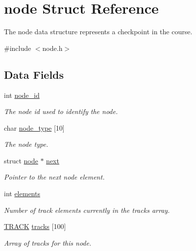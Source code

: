 \hypertarget{structnode}{\section{node Struct Reference}
\label{structnode}
}


The node data structure represents a checkpoint in the course.  




{\ttfamily \#include $<$node.\-h$>$}

\subsection*{Data Fields}
{\bf }\par
\begin{DoxyCompactItemize}
\item 
int \hyperlink{structnode_a805c6a03966d787e0ad1a877f6c0dd8c}{node\-\_\-id}
\begin{DoxyCompactList}\small\item\em The node id used to identify the node. \end{DoxyCompactList}\item 
\hypertarget{structnode_a171a822e7b60775670364819d3381240}{char \hyperlink{structnode_a171a822e7b60775670364819d3381240}{node\-\_\-type} \mbox{[}10\mbox{]}}\label{structnode_a171a822e7b60775670364819d3381240}

\begin{DoxyCompactList}\small\item\em The node type. \end{DoxyCompactList}\item 
\hypertarget{structnode_aa3e8aa83f864292b5a01210f4453fcc0}{struct \hyperlink{structnode}{node} $\ast$ \hyperlink{structnode_aa3e8aa83f864292b5a01210f4453fcc0}{next}}\label{structnode_aa3e8aa83f864292b5a01210f4453fcc0}

\begin{DoxyCompactList}\small\item\em Pointer to the next node element. \end{DoxyCompactList}\item 
\hypertarget{structnode_ab22778bf9ba1a9d0693071811bbe120b}{int \hyperlink{structnode_ab22778bf9ba1a9d0693071811bbe120b}{elements}}\label{structnode_ab22778bf9ba1a9d0693071811bbe120b}

\begin{DoxyCompactList}\small\item\em Number of track elements currently in the tracks array. \end{DoxyCompactList}\item 
\hypertarget{structnode_ad9bd405f917daba127e4a26649313401}{\hyperlink{track_8h_a1168d7895be9688fc0d8644aab306d6b}{T\-R\-A\-C\-K} \hyperlink{structnode_ad9bd405f917daba127e4a26649313401}{tracks} \mbox{[}100\mbox{]}}\label{structnode_ad9bd405f917daba127e4a26649313401}

\begin{DoxyCompactList}\small\item\em Array of tracks for this node. \end{DoxyCompactList}\end{DoxyCompactItemize}



